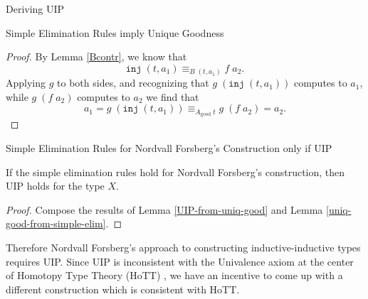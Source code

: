 \documentclass[runningheads]{llncs}
\newcommand{\good}[1]{{#1}_\text{good}}
\newcommand{\IdA}[3]{{#1}\equiv_{#3}{#2}}
\newcommand{\inj}{\texttt{inj}}
\def\Forsberg/{Nordvall Forsberg}
\begin{document}
\begin{section}{Deriving UIP}
\begin{subsection}{Simple Elimination Rules imply Unique Goodness}
\begin{proof}
    By Lemma \ref{Bcontr}, we know that \[\IdA{\inj\;(t, a_1)}{f\;a_2}{B\;(t, a_1)}.\] Applying $g$ to both sides, and recognizing that $g\;(\inj\;(t,a_1))$ computes to $a_1$, while $g\;(f\;a_2)$ computes to $a_2$ we find that \[a_1 = g\;(\inj\;(t,a_1)) \equiv_{\good{A}\;t} g\;(f\;a_2) = a_2.\]
\end{proof}

\end{subsection}

\begin{subsection}{Simple Elimination Rules for \Forsberg/'s Construction only if UIP}

\begin{theorem}\label{Forsberg-gives-UIP}
    If the simple elimination rules hold for \Forsberg/'s construction, then UIP holds for the type $X$.
\end{theorem}
\begin{proof}
    Compose the results of Lemma \ref{UIP-from-uniq-good} and Lemma \ref{uniq-good-from-simple-elim}.
\end{proof}

Therefore \Forsberg/'s approach to constructing inductive-inductive types requires UIP. Since UIP is inconsistent with the Univalence axiom at the center of Homotopy Type Theory (HoTT) \citep{hottbook}, we have an incentive to come up with a different construction which is consistent with HoTT.

\end{subsection}

\end{section}
\end{document}
